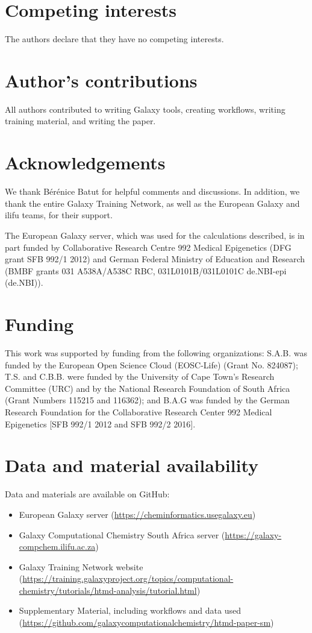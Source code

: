 \documentclass[twocolumn]{bmcart}%
\begin{document}
\begin{backmatter}

\section*{Competing interests}
  The authors declare that they have no competing interests.

\section*{Author's contributions}
All authors contributed to writing Galaxy tools, creating workflows, writing training material, and writing the paper.

\section*{Acknowledgements}
We thank Bérénice Batut for helpful comments and discussions. In addition, we thank the entire Galaxy Training Network, as well as the European Galaxy and ilifu teams, for their support.

The European Galaxy server, which was used for the calculations described, is in part funded by Collaborative Research Centre 992 Medical Epigenetics (DFG grant SFB 992/1 2012) and German Federal Ministry of Education and Research (BMBF grants 031 A538A/A538C RBC, 031L0101B/031L0101C de.NBI-epi (de.NBI)).

\section*{Funding}
This work was supported by funding from the following organizations: S.A.B. was funded by the European Open Science Cloud (EOSC-Life) (Grant No. 824087);  T.S. and C.B.B. were funded by the University of Cape Town’s Research Committee (URC) and by the National Research Foundation of South Africa (Grant Numbers 115215 and 116362); and B.A.G was funded by the German Research Foundation for the Collaborative Research Center 992 Medical Epigenetics [SFB 992/1 2012 and SFB 992/2 2016].

\section*{Data and material availability}
  Data and materials are available on GitHub:

  \begin{itemize}
  \item European Galaxy server (\url{https://cheminformatics.usegalaxy.eu}) 
  \item Galaxy Computational Chemistry South Africa server (\url{https://galaxy-compchem.ilifu.ac.za})
  \item Galaxy Training Network website (\url{https://training.galaxyproject.org/topics/computational-chemistry/tutorials/htmd-analysis/tutorial.html})
  \item Supplementary Material, including workflows and data used (\url{https://github.com/galaxycomputationalchemistry/htmd-paper-sm})
\end{itemize}



\end{backmatter}
\end{document}
